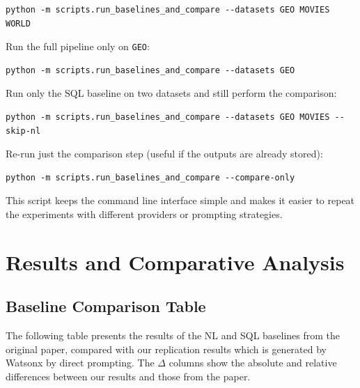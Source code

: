 \documentclass[12pt]{article}
\begin{document}
\begin{verbatim}
python -m scripts.run_baselines_and_compare --datasets GEO MOVIES WORLD
\end{verbatim}

Run the full pipeline only on \texttt{GEO}:

\begin{verbatim}
python -m scripts.run_baselines_and_compare --datasets GEO
\end{verbatim}

Run only the SQL baseline on two datasets and still perform the comparison:

\begin{verbatim}
python -m scripts.run_baselines_and_compare --datasets GEO MOVIES --skip-nl
\end{verbatim}

Re-run just the comparison step (useful if the outputs are already stored):

\begin{verbatim}
python -m scripts.run_baselines_and_compare --compare-only
\end{verbatim}

This script keeps the command line interface simple and makes it easier to
repeat the experiments with different providers or prompting strategies.


\section{Results and Comparative Analysis}

\subsection{Baseline Comparison Table}

The following table presents the results of the NL and SQL baselines from the original paper, compared with our replication results which is generated by Watsonx by direct prompting. The $\Delta$ columns show the absolute and relative differences between our results and those from the paper.
\end{document}

